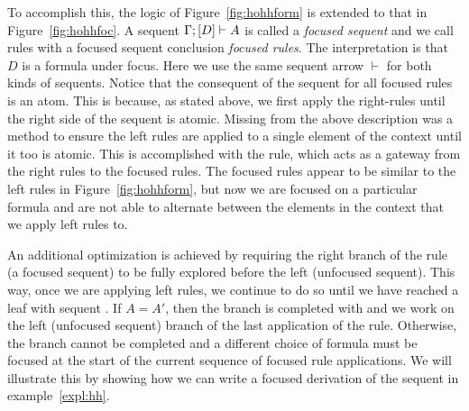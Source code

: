 To accomplish this, the logic of Figure~\ref{fig:hohhform} is extended to that in Figure~\ref{fig:hohhfoc}. A sequent $\seq[\dyncon{} ; {[D]}]{A}$ is called a \emph{focused sequent} and we call rules with a focused sequent conclusion \emph{focused rules}. The interpretation is that $D$ is a formula under focus. Here we use the same sequent arrow $\vdash$ for both kinds of sequents. Notice that the consequent of the sequent for all focused rules is an atom. This is because, as stated above, we first apply the right-rules until the right side of the sequent is atomic. Missing from the above description was a method to ensure the left rules are applied to a single element of the context until it too is atomic. This is accomplished with the  rule, which acts as a gateway from the right rules to the focused rules. The focused rules appear to be similar to the left rules in Figure~\ref{fig:hohhform}, but now we are focused on a particular formula and are not able to alternate between the elements in the context that we apply left rules to.

An additional optimization is achieved by requiring the right branch of the  rule (a focused sequent) to be fully explored before the left (unfocused sequent). This way, once we are applying left rules, we continue to do so until we have reached a leaf with sequent . If $A = A'$, then the branch is completed with  and we work on the left (unfocused sequent) branch of the last application of the  rule. Otherwise, the branch cannot be completed and a different choice of formula must be focused at the start of the current sequence of focused rule applications. We will illustrate this by showing how we can write a focused derivation of the sequent in example~\ref{expl:hh}.

